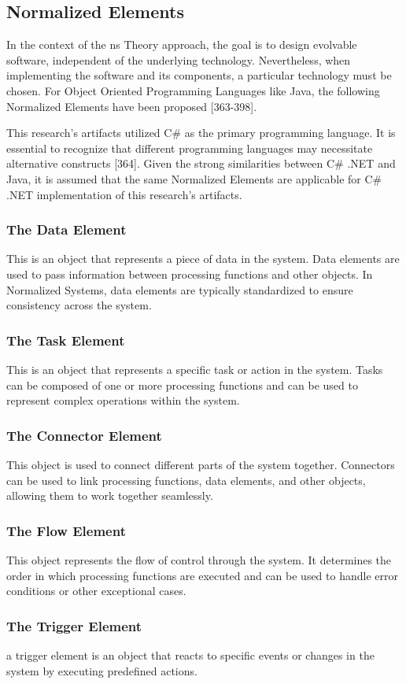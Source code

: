 \subsection{Normalized Elements} \label{subsec:ns_elements} 

In the context of the \gls{ns} Theory approach, the goal is to design evolvable software,
independent of the underlying technology. Nevertheless, when implementing the software and
its components, a particular technology must be chosen. For Object Oriented Programming
Languages like Java, the following Normalized Elements have been proposed
\parencite{mannaert_normalized_2016}[363-398].

This research's artifacts utilized C\# as the primary programming language. It is essential
to recognize that different programming languages may necessitate alternative constructs
\parencite{mannaert_normalized_2016}[364]. Given the strong similarities between C\# .NET
and Java, it is assumed that the same Normalized Elements are applicable for C\# .NET
implementation of this research's artifacts.

\subsubsection*{The Data Element}
This is an object that represents a piece of data in the system. Data elements are used to
pass information between processing functions and other objects. In Normalized Systems,
data elements are typically standardized to ensure consistency across the system.

\subsubsection*{The Task Element}
This is an object that represents a specific task or action in the system. Tasks can be
composed of one or more processing functions and can be used to represent complex
operations within the system.

\subsubsection*{The Connector Element}
This object is used to connect different parts of the system together. Connectors can be
used to link processing functions, data elements, and other objects, allowing them to work
together seamlessly.

\subsubsection*{The Flow Element}
This object represents the flow of control through the system. It determines the order in
which processing functions are executed and can be used to handle error conditions or
other exceptional cases.

\subsubsection*{The Trigger Element}
a trigger element is an object that reacts to specific events or changes in the system
by executing predefined actions.
